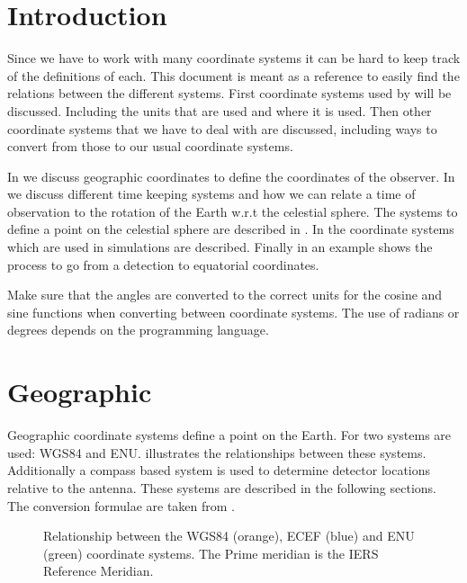 \section{Introduction}

Since we have to work with many coordinate systems it can be hard to
keep track of the definitions of each. This document is meant as a
reference to easily find the relations between the different systems.
First coordinate systems used by \hisparc will be discussed. Including
the units that are used and where it is used. Then other coordinate
systems that we have to deal with are discussed, including ways to
convert from those to our usual coordinate systems.

In  we discuss geographic coordinates to define
the coordinates of the observer. In  we discuss
different time keeping systems and how we can relate a time of
observation to the rotation of the Earth w.r.t the celestial sphere. The
systems to define a point on the celestial sphere are described in
. In  the coordinate systems
which are used in \corsika simulations are described. Finally in
 an example shows the process to go from a \hisparc
detection to equatorial coordinates.

Make sure that the angles are converted to the correct units for the
cosine and sine functions when converting between coordinate systems.
The use of radians or degrees depends on the programming language.


\section{Geographic}
\label{sec:geographic}

Geographic coordinate systems define a point on the Earth. For \hisparc
two systems are used: WGS84 and ENU. 
illustrates the relationships between these systems. Additionally a
compass based system is used to determine detector locations relative to
the \gps antenna. These systems are described in the following sections.
The conversion formulae are taken from \cite[sec.~K]{usno:2014aa}.

\begin{figure}
    \centering
    
    \caption{Relationship between the WGS84 (orange), ECEF (blue) and ENU
             (green) coordinate systems. The Prime meridian is the IERS
             Reference Meridian.}
    \label{fig:wgs84_ecef_enu}
\end{figure}


